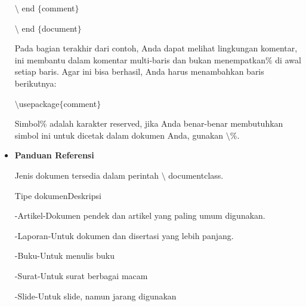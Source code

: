 \begin{itemize}
\hspace*{0.5in}$\setminus$ end $ \{ $comment$ \} $\par

\hspace*{0.5in}$\setminus$ end $ \{ $document$ \} $\par
\vspace{\baselineskip}
Pada bagian terakhir dari contoh, Anda dapat melihat lingkungan komentar, ini membantu dalam komentar multi-baris dan bukan menempatkan$\%$ di awal setiap baris. Agar ini bisa berhasil, Anda harus menambahkan baris berikutnya:\par
\vspace{\baselineskip}
\hspace*{0.64in}$\setminus$usepackage$ \{ $comment$ \} $\par

Simbol$\%$ adalah karakter reserved, jika Anda benar-benar membutuhkan simbol ini untuk dicetak dalam dokumen Anda, gunakan $\setminus$$\%$.\par
\vspace{\baselineskip}
\vspace{10pt}
	\item {\fontsize{14pt}{14pt}\selectfont \textbf{Panduan Referensi}}\par
\vspace{\baselineskip}
Jenis dokumen tersedia dalam perintah $\setminus$ documentclass.\par
\vspace{\baselineskip}
Tipe dokumen\hspace*{0.5in}Deskripsi\hspace*{0.5in}\par

-Artikel\hspace*{0.5in}-Dokumen pendek dan artikel yang paling umum digunakan.\par

-Laporan\hspace*{0.5in}-Untuk dokumen dan disertasi yang lebih panjang.\par

-Buku\hspace*{0.6in}-Untuk menulis buku\par

-Surat\hspace*{0.6in}-Untuk surat berbagai macam\hspace*{0.5in}\par

-Slide\hspace*{0.6in}-Untuk slide, namun jarang digunakan\par


\end{itemize}
